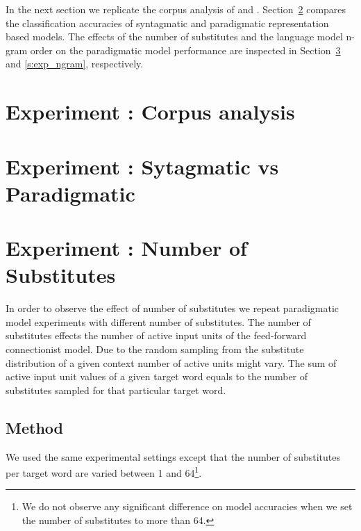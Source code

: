 In the next section we replicate the corpus analysis of \cite{Mintz200391} and
\cite{clair2010}.  Section~\ref{s:exp_paradigmatic} compares the classification
accuracies of syntagmatic and paradigmatic representation based models.  The
effects of the number of substitutes and the language model n-gram order on the
paradigmatic model performance are inspected in Section~\ref{s:exp_substitutes}
and \ref{s:exp_ngram}, respectively. 

\section{Experiment : Corpus analysis}
\label{s:exp_corpus}
\section{Experiment : Sytagmatic vs Paradigmatic}
\label{s:exp_paradigmatic}


\section{Experiment : Number of Substitutes}
\label{s:exp_substitutes}
In order to observe the effect of number of substitutes we repeat paradigmatic
model experiments with different number of substitutes.  The number of
substitutes effects the number of active input units of the feed-forward
connectionist model.  Due to the random sampling from the substitute
distribution of a given context number of active units might vary.  The sum of
active input unit values of a given target word equals to the number of
substitutes sampled for that particular target word. 

\subsection{Method} 

We used the same experimental settings except that the number of substitutes
per target word are varied between 1 and 64\footnote{We do not observe any
significant difference on model accuracies when we set the number of
substitutes to  more than 64.}.

